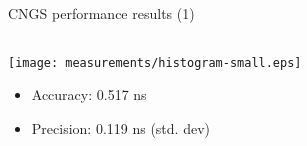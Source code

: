 \documentclass[compress,red]{beamer}
\begin{document}
\begin{frame}{CNGS performance results (1)}

  \begin{columns}[c]
	  \begin{center}

		\hspace{-1cm}
		\texttt{[image: measurements/histogram-small.eps]}
		\begin{itemize}
			\item Accuracy: 0.517 ns
			\item Precision: 0.119 ns (std. dev)
		\end{itemize}			



\end{center}
\end{columns}
\end{frame}
\end{document}
